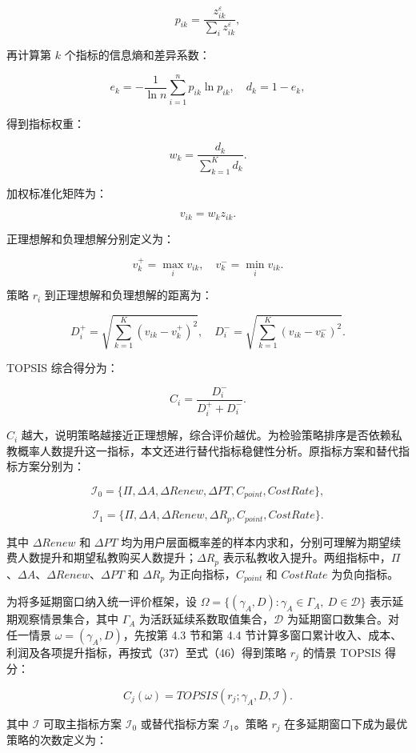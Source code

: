 \documentclass[
  12pt,
]{ctexart}
\begin{document}
\[
p_{ik}=\frac{z_{ik}^{\varepsilon}}{\sum_i z_{ik}^{\varepsilon}},
\tag{40}
\]

再计算第 \(k\) 个指标的信息熵和差异系数：

\[
e_k=-\frac{1}{\ln n}\sum_{i=1}^{n}p_{ik}\ln p_{ik},\quad d_k=1-e_k,
\tag{41}
\]

得到指标权重：

\[
w_k=\frac{d_k}{\sum_{k=1}^{K}d_k}.
\tag{42}
\]

加权标准化矩阵为：

\[
v_{ik}=w_kz_{ik}.
\tag{43}
\]

正理想解和负理想解分别定义为：

\[
v_k^+=\max_i v_{ik},\quad v_k^-=\min_i v_{ik}.
\tag{44}
\]

策略 \(r_i\) 到正理想解和负理想解的距离为：

\[
D_i^+=\sqrt{\sum_{k=1}^{K}(v_{ik}-v_k^+)^2},\quad
D_i^-=\sqrt{\sum_{k=1}^{K}(v_{ik}-v_k^-)^2}.
\tag{45}
\]

TOPSIS 综合得分为：

\[
C_i=\frac{D_i^-}{D_i^+ + D_i^-}.
\tag{46}
\]

\(C_i\) 越大，说明策略越接近正理想解，综合评价越优。为检验策略排序是否依赖私教概率人数提升这一指标，本文还进行替代指标稳健性分析。原指标方案和替代指标方案分别为：

\[
\mathcal{I}_0=\{\Pi,\Delta A,\Delta Renew,\Delta PT,C_{point},CostRate\},
\tag{47}
\]

\[
\mathcal{I}_1=\{\Pi,\Delta A,\Delta Renew,\Delta R_p,C_{point},CostRate\}.
\tag{48}
\]

其中 \(\Delta Renew\) 和 \(\Delta PT\) 均为用户层面概率差的样本内求和，分别可理解为期望续费人数提升和期望私教购买人数提升；\(\Delta R_p\) 表示私教收入提升。两组指标中，\(\Pi\)、\(\Delta A\)、\(\Delta Renew\)、\(\Delta PT\) 和 \(\Delta R_p\) 为正向指标，\(C_{point}\) 和 \(CostRate\) 为负向指标。

为将多延期窗口纳入统一评价框架，设 \(\Omega=\{(\gamma_A,D):\gamma_A\in\Gamma_A,\ D\in\mathcal{D}\}\) 表示延期观察情景集合，其中 \(\Gamma_A\) 为活跃延续系数取值集合，\(\mathcal{D}\) 为延期窗口数集合。对任一情景 \(\omega=(\gamma_A,D)\)，先按第 4.3 节和第 4.4 节计算多窗口累计收入、成本、利润及各项提升指标，再按式（37）至式（46）得到策略 \(r_j\) 的情景 TOPSIS 得分：

\[
C_j(\omega)=TOPSIS\left(r_j;\gamma_A,D,\mathcal{I}\right).
\tag{49}
\]

其中 \(\mathcal{I}\) 可取主指标方案 \(\mathcal{I}_0\) 或替代指标方案 \(\mathcal{I}_1\)。策略 \(r_j\) 在多延期窗口下成为最优策略的次数定义为：
\end{document}

